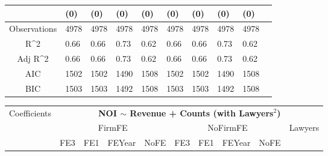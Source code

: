 \documentclass{article}
\begin{document}
\begin{table}[H]
\begin{tabular}{|clllllllll|}
   & (0) & (0) & (0) & (0) & (0) & (0) & (0) & (0) & \\ 
  \hline 
 Observations & 4978 & 4978 & 4978 & 4978 & 4978 & 4978 & 4978 & 4978 & \\ 
  R^2 & 0.66 & 0.66 & 0.73 & 0.62 & 0.66 & 0.66 & 0.73 & 0.62 & \\ 
  Adj R^2 & 0.66 & 0.66 & 0.73 & 0.62 & 0.66 & 0.66 & 0.73 & 0.62 & \\ 
  AIC & 1502 & 1502 & 1490 & 1508 & 1502 & 1502 & 1490 & 1508 & \\ 
  BIC & 1503 & 1503 & 1492 & 1508 & 1503 & 1503 & 1492 & 1508 & \\ 
   \hline
\end{tabular}
 
\end{table}


\begin{table}[H]
\centering
\begin{tabular}{|clllllllll|}
\hline
\multirow{3}{*}{Coefficients} & \multicolumn{9}{c|}{\textbf{NOI $\sim$ Revenue + Counts (with Lawyers$^2$)}} \\
\cline{2-10}
& \multicolumn{4}{c}{FirmFE} & \multicolumn{4}{c}{NoFirmFE} & \multirow{2}{*}{Lawyers} \\
\cline{2-9}
& FE3 & FE1 & FEYear & NoFE & FE3 & FE1 & FEYear & NoFE &  \\
\hline
 

\end{tabular}
\end{table}
\end{document}
